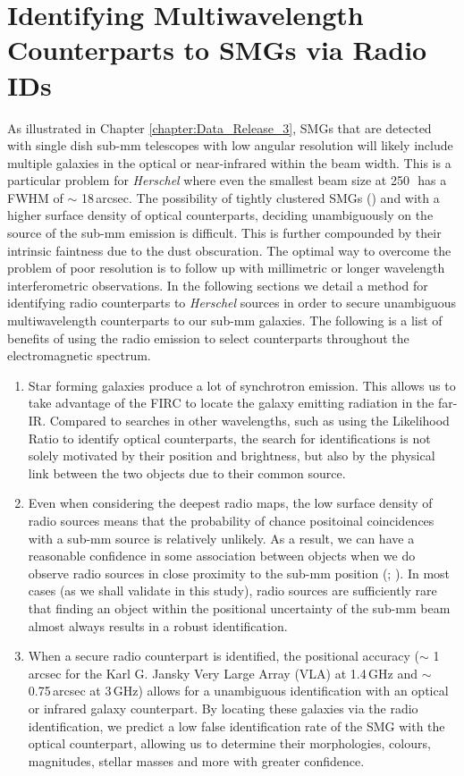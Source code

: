\section{Identifying Multiwavelength Counterparts to SMGs via Radio IDs}

As illustrated in Chapter \ref{chapter:Data_Release_3}, SMGs that are detected with single dish sub-mm telescopes with low angular resolution will likely include multiple galaxies in the optical or near-infrared within the beam width. This is a particular problem for \textit{Herschel} where even the smallest beam size at 250\,\micron\ has a FWHM of $\sim$ 18\,arcsec. The possibility of tightly clustered SMGs (\citealt{Blain_2004}) and with a higher surface density of optical counterparts, deciding unambiguously on the source of the sub-mm emission is difficult. This is further compounded by their intrinsic faintness due to the dust obscuration. The optimal way to overcome the problem of poor resolution is to follow up with millimetric or longer wavelength interferometric observations. In the following sections we detail a method for identifying radio counterparts to \textit{Herschel} sources in order to secure unambiguous multiwavelength counterparts to our sub-mm galaxies. The following is a list of benefits of using the radio emission to select counterparts throughout the electromagnetic spectrum.

\begin{enumerate}
    \item Star forming galaxies produce a lot of synchrotron emission. This allows us to take advantage of the FIRC to locate the galaxy emitting radiation in the far-IR. Compared to searches in other wavelengths, such as using the Likelihood Ratio to identify optical counterparts, the search for identifications is not solely motivated by their position and brightness, but also by the physical link between the two objects due to their common source.
    \item Even when considering the deepest radio maps, the low surface density of radio sources means that the probability of chance positoinal coincidences with a sub-mm source is relatively unlikely. As a result, we can have a reasonable confidence in some association between objects when we do observe radio sources in close proximity to the sub-mm position (\citealt{Ivison_2002}; \citealt{Borys_2004}). In most cases (as we shall validate in this study), radio sources are sufficiently rare that finding an object within the positional uncertainty of the sub-mm beam almost always results in a robust identification.
    \item When a secure radio counterpart is identified, the positional accuracy ($\sim$ 1\,arcsec for the Karl G. Jansky Very Large Array (VLA) at 1.4\,GHz and $\sim$ 0.75\,arcsec at 3\,GHz) allows for a unambiguous identification with an optical or infrared galaxy counterpart. By locating these galaxies via the radio identification, we predict a low false identification rate of the SMG with the optical counterpart, allowing us to determine their morphologies, colours, magnitudes, stellar masses and more with greater confidence.
\end{enumerate}

